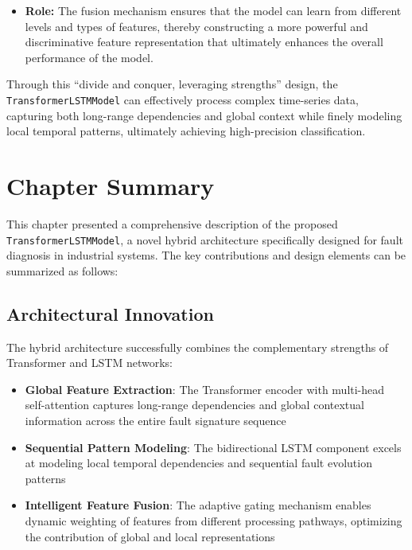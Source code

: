 \begin{itemize}
\begin{itemize}
        \item \textbf{Role:} The fusion mechanism ensures that the model can learn from different levels and types of features, thereby constructing a more powerful and discriminative feature representation that ultimately enhances the overall performance of the model.
    \end{itemize}
\end{itemize}

Through this ``divide and conquer, leveraging strengths'' design, the \texttt{TransformerLSTMModel} can effectively process complex time-series data, capturing both long-range dependencies and global context while finely modeling local temporal patterns, ultimately achieving high-precision classification.

\section{Chapter Summary}
\label{sec:hybrid_model:summary}

This chapter presented a comprehensive description of the proposed \texttt{TransformerLSTMModel}, a novel hybrid architecture specifically designed for fault diagnosis in industrial systems. The key contributions and design elements can be summarized as follows:

\subsection{Architectural Innovation}

The hybrid architecture successfully combines the complementary strengths of Transformer and LSTM networks:

\begin{itemize}
    \item \textbf{Global Feature Extraction}: The Transformer encoder with multi-head self-attention captures long-range dependencies and global contextual information across the entire fault signature sequence \citep{vaswani2017attention}
    \item \textbf{Sequential Pattern Modeling}: The bidirectional LSTM component excels at modeling local temporal dependencies and sequential fault evolution patterns \citep{hochreiter1997long}
    \item \textbf{Intelligent Feature Fusion}: The adaptive gating mechanism enables dynamic weighting of features from different processing pathways, optimizing the contribution of global and local representations
\end{itemize}

